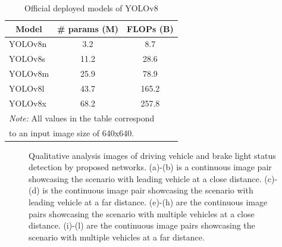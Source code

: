 \begin{table}[h]
    \caption{Official deployed models of YOLOv8}
    \label{tab:yolov8}
    \begin{tabular}{lcc}
    \toprule
    \multicolumn{1}{c}{Model}   & \# params (M) & FLOPs (B) \\
    \midrule
    YOLOv8n & 3.2        & 8.7       \\
    YOLOv8s & 11.2       & 28.6      \\
    YOLOv8m & 25.9       & 78.9      \\
    YOLOv8l & 43.7       & 165.2     \\
    YOLOv8x & 68.2       & 257.8     \\
    \bottomrule
    \multicolumn{3}{l}{\textit{Note:} All values in the table correspond}\\
    \multicolumn{3}{l}{\qquad \; to an input image size of 640x640.}
    \end{tabular}%
\end{table}

\begin{figure}[t]%
    \captionsetup[subfigure]{justification=centering}

    \hfill
    \hfill

\caption{Qualitative analysis images of driving vehicle and brake light status detection by proposed networks. (a)-(b) is a continuous image pair showcasing the scenario with leading vehicle at a close distance. (c)-(d) is the continuous image pair showcasing the scenario with leading vehicle at a far distance. (e)-(h) are the continuous image pairs showcasing the scenario with multiple vehicles at a close distance. (i)-(l) are the continuous image pairs showcasing the scenario with multiple vehicles at a far distance.
}
\label{fig:qualitative_perf}%
\end{figure}

